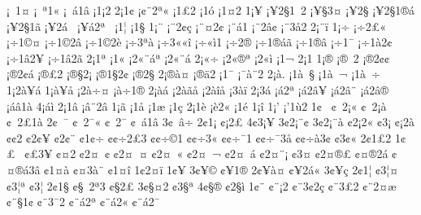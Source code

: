 {^^a1^^a01^^a4
^^a1^^a0^^aa1^^ab
^^a1^^a0^^e11^^e2
^^a11^^a12
2^^a11^^a2
^^a1^^a2^^a82^^aa^^ab
^^a11^^a32
^^a11^^f3
^^a11^^a42
1^^a1^^a5
^^a1^^a52^^a71^^a02
^^a1^^a5^^a73^^a4
^^a1^^a52^^a7^^ad
^^a1^^a52^^a71^^ae^^e1
^^a1^^a52^^a71^^e3
^^a1^^a52^^e1^^a0
^^a1^^a5^^e12^^aa^^a0
^^a11^^a6
^^a11^^a7
1^^a1^^a8
^^a1^^a82^^a2^^e7
^^a1^^a8^^a42^^a2
^^a1^^a8^^e11
^^a1^^a82^^e2^^a2
^^a1^^a83^^e52
2^^a1^^a8^^ef
1^^a1^^f7
^^a1^^f72^^a3^^ab
^^a1^^f71^^a9^^a4
^^a1^^f71^^a92^^e2
^^a1^^f71^^a92^^e8
^^a1^^f73^^aa^^e0
^^a1^^f73^^ab^^ab^^ee
^^a1^^f7^^ab^^ec1
^^a1^^f72^^ae^^ad
^^a1^^f71^^ae^^e1^^e3
^^a1^^f71^^ae^^e2
^^a1^^f71^^af
^^a1^^f71^^e02^^a2
^^a1^^f71^^e22^^ad^^a5
^^a1^^f71^^e22^^ad^^e3
2^^a11^^aa
^^a11^^ab
^^a12^^ab^^a8^^e1^^aa
^^a12^^ab^^a8^^e1^^ad
2^^a1^^ab^^f7
^^a12^^ab^^ae^^aa
^^a12^^ab^^ec
^^a11^^ac
2^^a11^^ad
1^^a1^^ae
^^a1^^ae^^a02
^^a1^^ae2^^a2^^a2
^^a1^^ae2^^a2^^e1
^^a1^^ae^^a32
^^a1^^ae^^a72^^a1
^^a1^^ae1^^a72^^a2
^^a1^^ae2^^a7^^ad
2^^a1^^ae^^e0^^a4
^^a1^^ae^^e42
^^a11^^af
^^a1^^af^^e0^^a82
2^^a1^^e0.
^^a11^^e0^^a0^^a7
^^a11^^e0^^a0^^ac
^^a11^^e0^^a0^^ad^^f7
1^^a12^^e0^^a5^^e1
1^^a1^^e0^^a5^^e5
^^a12^^e0^^f7^^a4
^^a1^^e0^^f71^^ae
2^^a1^^e0^^e1
^^a12^^e0^^e3^^e5
^^a12^^e0^^ee^^e5
^^a13^^e0^^ef
2^^a13^^e1
^^a1^^e12^^aa
^^a1^^e12^^e2^^a5
^^a1^^e12^^e2^^a8
^^a1^^e12^^e2^^ae
^^a1^^e1^^e21^^e0
4^^a1^^e1^^ec
2^^a11^^e2
^^a1^^e2^^a82^^e2
1^^a1^^e3
^^a11^^e5
^^a11^^e6
^^a11^^e7
2^^a11^^e8
^^a1^^e82^^ab
^^a11^^e9
1^^a1^^ee
1^^a1'
^^a1'1^^f92
1^^a2^^a0
^^a2^^a02^^a1^^ab
^^a2^^a02^^a1^^e0
^^a2^^a02^^a31^^e0
2^^a2^^a0^^af
^^a2^^a02^^af^^ab
^^a2^^a02^^af^^ad
^^a2^^a0^^e11^^e2
3^^a2^^a0^^e2^^f7
2^^a21^^a1
^^a2^^a12^^a3
4^^a23^^a1^^a5
3^^a22^^a1^^a8^^a2
3^^a22^^a1^^a8^^e0
^^a22^^a12^^ab
^^a23^^a1^^ad
^^a2^^a12^^e0
^^a2^^a22
^^a22^^a2^^a5
^^a22^^a2^^a8
^^a21^^a2^^f7
^^a2^^a2^^f72^^a33
^^a2^^a2^^f7^^a91
^^a2^^a2^^f73^^ab
^^a2^^a2^^f7^^af1
^^a2^^a2^^f7^^af3^^e5^^ad
^^a2^^a2^^f7^^e03^^a2
^^a23^^a2^^ab
2^^a21^^a32
1^^a2^^a3^^a0
^^a2^^a33^^ad^^a5
^^a2^^a42
^^a22^^a4^^a0^^a2
^^a22^^a4^^a0^^a4
^^a22^^a4^^a0^^ab
^^a22^^a4^^a0^^ac
^^a22^^a4^^a0^^e1
^^a22^^a4^^a8^^a1
^^a23^^a4^^ad
^^a22^^a4^^ae^^a3
^^a2^^a4^^ae2^^e1
^^a2^^a4^^ae^^e13^^e2
^^a21^^a4^^e0
^^a2^^a43^^e0^^a8
^^a21^^a4^^ee
1^^a22^^a4^^ef
1^^a2^^a5
3^^a2^^a5^^a9
^^a2^^a51^^ae
2^^a2^^a5^^e0^^a4
^^a2^^a52^^e1^^ab
3^^a2^^a5^^e7
2^^a21^^a6
^^a23^^a6^^a4
^^a23^^a6^^aa
^^a23^^a6^^ad
2^^a21^^a7
^^a2^^a7^^a02^^aa3
^^a2^^a72^^a3
3^^a2^^a7^^a42
^^a23^^a7^^aa
4^^a2^^a7^^ae
^^a22^^a7^^ec
1^^a2^^a8
^^a2^^a8^^a12
^^a2^^a83^^a22^^e7
^^a2^^a83^^a32
^^a2^^a82^^a4^^e6
^^a2^^a8^^a71^^a2
^^a2^^a83^^af2
^^a2^^a8^^e12^^aa
^^a2^^a8^^e12^^ab
^^a2^^a8^^e12^^af
}
